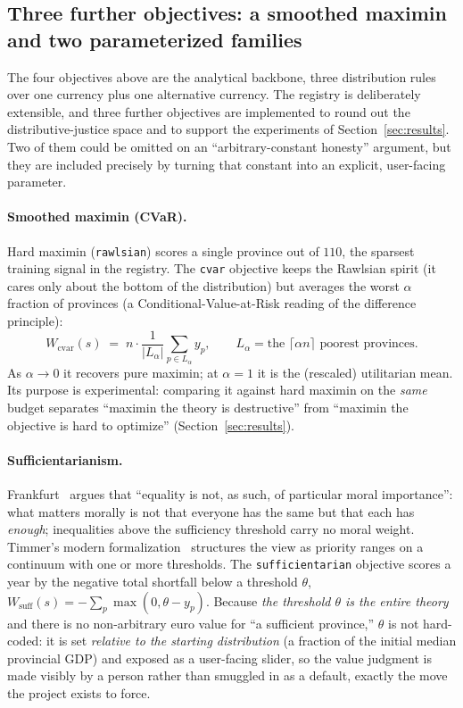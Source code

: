 \documentclass[11pt,a4paper]{article}
\newcommand{\code}[1]{\texttt{#1}}
\begin{document}
\subsection{Three further objectives: a smoothed maximin and two parameterized families}
\label{sec:notimplemented}

The four objectives above are the analytical backbone, three distribution
rules over one currency plus one alternative currency. The registry is
deliberately extensible, and three further objectives are implemented to round
out the distributive-justice space and to support the experiments of
Section~\ref{sec:results}. Two of them could be omitted on an
``arbitrary-constant honesty'' argument, but they are included precisely by
turning that constant into an explicit, user-facing parameter.

\paragraph{Smoothed maximin (CVaR).} Hard maximin (\code{rawlsian}) scores a
single province out of $110$, the sparsest training signal in the registry. The
\code{cvar} objective keeps the Rawlsian spirit (it cares only about the
bottom of the distribution) but averages the worst $\alpha$ fraction of
provinces (a Conditional-Value-at-Risk reading of the difference principle):
\begin{equation}
    W_{\text{cvar}}(s) \;=\; n \cdot \frac{1}{|L_\alpha|}\sum_{p \in L_\alpha} y_p,
    \qquad L_\alpha = \text{the } \lceil \alpha n \rceil \text{ poorest provinces}.
\end{equation}
As $\alpha \to 0$ it recovers pure maximin; at $\alpha = 1$ it is the (rescaled)
utilitarian mean. Its purpose is experimental: comparing it against hard maximin
on the \emph{same} budget separates ``maximin the theory is destructive'' from
``maximin the objective is hard to optimize'' (Section~\ref{sec:results}).

\paragraph{Sufficientarianism.} Frankfurt~\cite{frankfurt1987} argues that
``equality is not, as such, of particular moral importance'': what matters
morally is not that everyone has the same but that each has \emph{enough};
inequalities above the sufficiency threshold carry no moral weight. Timmer's
modern formalization~\cite{timmer2021} structures the view as priority ranges
on a continuum with one or more thresholds. The \code{sufficientarian} objective
scores a year by the negative total shortfall below a threshold $\theta$,
$W_{\text{suff}}(s) = -\sum_p \max(0, \theta - y_p)$. Because \emph{the threshold
$\theta$ is the entire theory} and there is no non-arbitrary euro value for ``a
sufficient province,'' $\theta$ is not hard-coded: it is set \emph{relative to
the starting distribution} (a fraction of the initial median provincial GDP) and
exposed as a user-facing slider, so the value judgment is made visibly by a
person rather than smuggled in as a default, exactly the move the project
exists to force.
\end{document}
